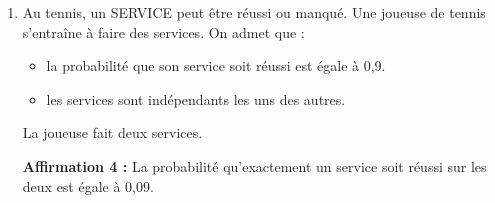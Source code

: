 \documentclass[10pt]{article}
\begin{document}
\begin{enumerate}
\item Au tennis, un SERVICE peut être réussi ou manqué. Une joueuse de tennis s'entraîne à faire des services. On admet que :
\begin{itemize}
\item la probabilité que son service soit réussi est égale à 0,9.
\item les services sont indépendants les uns des autres.
\end{itemize}

La joueuse fait deux services.

\textbf{Affirmation 4 :} La probabilité qu'exactement un service soit réussi sur les deux est égale à 0,09.
\end{enumerate}
\end{document}
